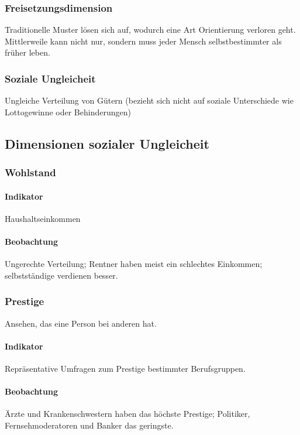 \documentclass{article}
\begin{document}
	\subsubsection{Freisetzungsdimension}
	Traditionelle Muster lösen sich auf, wodurch eine Art Orientierung verloren geht. Mittlerweile kann nicht nur, sondern muss jeder Mensch selbstbestimmter als früher leben.

	\subsubsection{Soziale Ungleicheit}
	Ungleiche Verteilung von Gütern (bezieht sich nicht auf soziale Unterschiede wie Lottogewinne oder Behinderungen)

	\subsection{Dimensionen sozialer Ungleicheit}

	\subsubsection{Wohlstand}
	\paragraph{Indikator}
	Haushaltseinkommen

	\paragraph{Beobachtung}
	Ungerechte Verteilung; Rentner haben meist ein schlechtes Einkommen; selbstständige verdienen besser.

	\subsubsection{Prestige}
	Ansehen, das eine Person bei anderen hat.

	\paragraph{Indikator}
	Repräsentative Umfragen zum Prestige bestimmter Berufsgruppen.

	\paragraph{Beobachtung}
	Ärzte und Krankenschwestern haben das höchste Prestige; Politiker, Fernsehmoderatoren und Banker das geringste.
\end{document}
